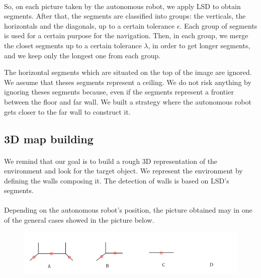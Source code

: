 \documentclass[12pt]{report}
\begin{document}
  \paragraph{}
  So, on each picture taken by the autonomous robot, we apply LSD to obtain segments. After that, the segments are classified into groups: the verticals, the horizontals and the diagonals, up to a certain tolerance $\epsilon$. Each group of segments is used for a certain purpose for the navigation. Then, in each group, we merge the closet segments up to a certain tolerance $\lambda$, in order to get longer segments, and we keep only the longest one from each group. 

The horizontal segments which are situated on the top of the image are ignored. We assume that theses segments represent a ceiling. We do not risk anything by ignoring theses segments because, even if the segments represent a frontier between the floor and far wall. We built a strategy where the autonomous robot gets closer to the far wall to construct it.
    \subsection{3D map building}
    
    \paragraph{}
    We remind that our goal is to build a rough 3D representation of the environment and look for the target object. We represent the environment by defining the walls composing it. The detection of walls is based on LSD's segments.
    
    \paragraph{}
    Depending on the autonomous robot's position, the picture obtained may in one of the general cases showed in the picture below. 
    
    
    	\begin{figure}[H]
    	\begin{center}
    		\includegraphics[scale=0.6]{res/cases_seg.png}
    	\end{center}
    \end{figure}
\end{document}

